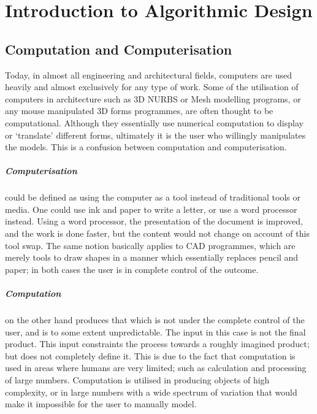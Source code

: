 \chapter{Introduction to Algorithmic Design}
\section{Computation and Computerisation}

Today, in almost all engineering and architectural fields, computers are used heavily and almost exclusively for any type of work. Some of the utilisation of computers in architecture such as 3D NURBS or Mesh modelling programs, or any mouse manipulated 3D forms programmes, are often thought to be computational. Although they essentially use numerical computation to display or `translate' \cite{terzidis06} different forms, ultimately it is the user who willingly manipulates the models.  This is a confusion between computation and computerisation. 

\paragraph{Computerisation}could be defined as using the computer as a tool instead of traditional tools or media. One could use ink and paper to write a letter, or use a word processor instead. Using a word processor, the presentation of the document is improved, and the work is done faster, but the content would not change on account of this tool swap. The same notion basically applies to CAD programmes, which are merely tools to draw shapes in a manner which essentially replaces pencil and paper; in both cases the user is in complete control of the outcome.

\paragraph{Computation}on the other hand produces that which is not under the complete control of the user, and is to some extent unpredictable. The input in this case is not the final product. This input constraints the process towards a roughly imagined product; but does not completely define it. This is due to the fact that computation is used in areas where humans are very limited; such as calculation and processing of large numbers. Computation is utilised in producing objects of high complexity, or in large numbers with a wide spectrum of variation that would make it impossible for the user to manually model.


